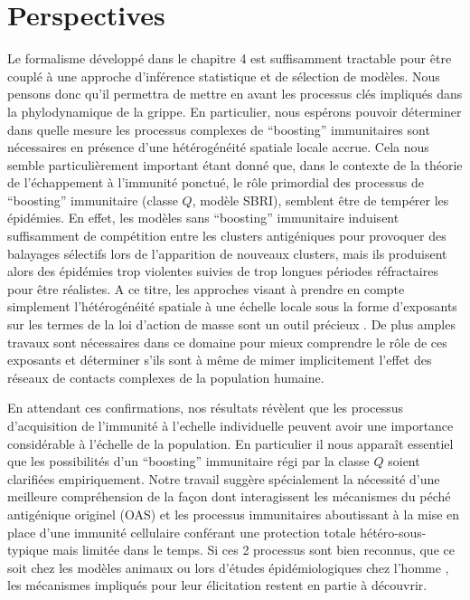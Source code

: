 \section{Perspectives}

Le formalisme développé dans le chapitre 4 est suffisamment tractable
pour être couplé à une approche d'inférence statistique et de
sélection de modèles. Nous pensons donc qu'il permettra de mettre en
avant les processus clés impliqués dans la phylodynamique de la
grippe. En particulier, nous espérons pouvoir déterminer dans quelle
mesure les processus complexes de ``boosting'' immunitaires sont
nécessaires en présence d'une hétérogénéité spatiale locale accrue.
Cela nous semble particulièrement important étant donné que, dans le
contexte de la théorie de l'échappement à l'immunité ponctué, le rôle
primordial des processus de ``boosting'' immunitaire (classe $Q$,
modèle SBRI), semblent être de tempérer les épidémies. En effet, les
modèles sans ``boosting'' immunitaire induisent suffisamment de
compétition entre les clusters antigéniques pour provoquer des
balayages sélectifs lors de l'apparition de nouveaux clusters, mais
ils produisent alors des épidémies trop violentes suivies de trop
longues périodes réfractaires pour être réalistes. A ce titre, les
approches visant à prendre en compte simplement l'hétérogénéité
spatiale à une échelle locale sous la forme d'exposants sur les termes
de la loi d'action de masse sont un outil précieux \citep{Liu1987,
  Roy2006}. De plus amples travaux sont nécessaires dans ce domaine
pour mieux comprendre le rôle de ces exposants et déterminer s'ils
sont à même de mimer implicitement l'effet des réseaux de contacts
complexes de la population humaine.

En attendant ces confirmations, nos résultats révèlent que les
processus d'acquisition de l'immunité à l'echelle individuelle peuvent
avoir une importance considérable à l'échelle de la population. En
particulier il nous apparaît essentiel que les possibilités d'un
``boosting'' immunitaire régi par la classe $Q$ soient clarifiées
empiriquement. Notre travail suggère spécialement la nécessité d'une
meilleure compréhension de la façon dont interagissent les mécanismes
du péché antigénique originel (OAS) et les processus immunitaires
aboutissant à la mise en place d'une immunité cellulaire conférant une
protection totale hétéro-sous-typique mais limitée dans le temps. Si
ces 2 processus sont bien reconnus, que ce soit chez les modèles
animaux \citep{Grebe2008, Kim2009} ou lors d'études épidémiologiques
chez l'homme \citep{Slepushkin1959, Epstein2006}, les mécanismes
impliqués pour leur élicitation restent en partie à découvrir.

